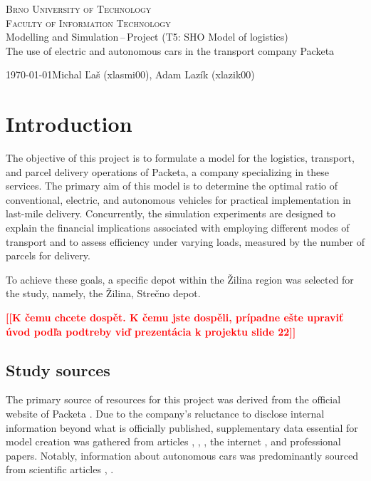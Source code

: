 \documentclass[a4paper, 11pt, a4paper]{article}
\newcommand{\todo}[1]{\textcolor{red}{\textbf{[[#1]]}}}
\begin{document}
\begin{titlepage}
    \begin{center}
            \textsc{\Huge Brno University of Technology \\}
            \vspace{0.5em}
            \textsc{\huge Faculty of Information Technology \\}
            {\LARGE 	Modelling and Simulation\,--\,Project (T5: SHO Model of logistics) \\ 
            \vspace{0.4em}
            \Huge The use of electric and autonomous cars in the transport company Packeta}
    \end{center}
    {\Large \today \hfill Michal Ľaš (xlasmi00), Adam Lazík (xlazik00)}
\end{titlepage}

\tableofcontents
\newpage

\section{Introduction}

The objective of this project is to formulate a model for the logistics, transport, and parcel delivery operations of Packeta, 
a company specializing in these services. The primary aim of this model is to determine the optimal ratio of conventional, electric, 
and autonomous vehicles for practical implementation in last-mile delivery. Concurrently, the simulation experiments are designed to 
explain the financial implications associated with employing different modes of transport and to assess efficiency under varying loads, 
measured by the number of parcels for delivery.

To achieve these goals, a specific depot within the Žilina region was selected for the study, namely, the Žilina, Strečno depot.

\noindent\todo{K čemu chcete dospět. K čemu jste dospěli, prípadne ešte upraviť úvod podľa podtreby viď prezentácia k projektu slide 22}


\subsection{Study sources}

The primary source of resources for this project was derived from the official website of Packeta \cite{packeta}. 
Due to the company's reluctance to disclose internal information beyond what is officially published, 
supplementary data essential for model creation was gathered from articles \cite{delivery.distance}, \cite{delivery.percentage}, 
\cite{parcels.num}, the internet \cite{peugeot}, and professional papers. 
Notably, information about autonomous cars was predominantly sourced from scientific articles \cite{autonomous.emissions}, \cite{autonomous.models}.
\end{document}

